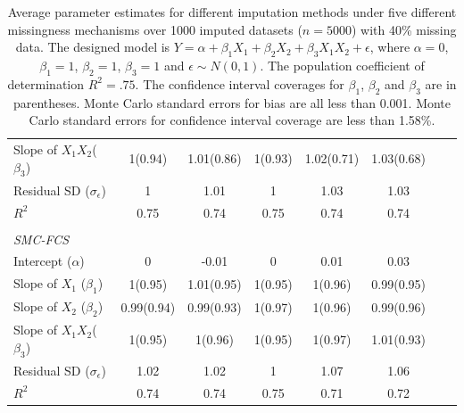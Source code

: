 \begin{table}[ht!]
{\begin{tabular}{lcccccrl}
				Slope of $X_1X_2$($\beta_3$)     &1(0.94) &1.01(0.86)   &1(0.93) &1.02(0.71)  &1.03(0.68)\\
				Residual SD ($\sigma_\epsilon$) 	&1		&1.01		&1		&1.03	&1.03\\	
				$R^2$						&0.75	&0.74	&0.75	&0.74	&0.74\\\\
				\textit{SMC-FCS}	&&&&&\\
				Intercept ($\alpha$)				&0	&-0.01	&0	&0.01	&0.03\\
				Slope of $X_1$ ($\beta_1$)			&1(0.95)	&1.01(0.95)	&1(0.95)	&1(0.96)	&0.99(0.95)\\
				Slope of $X_2$ ($\beta_2$)		&0.99(0.94)	&0.99(0.93)	&1(0.97)	&1(0.96)	&0.99(0.96)\\
				Slope of $X_1X_2$($\beta_3$)    &1(0.95)  &1(0.96)  &1(0.95)   &1(0.97)  &1.01(0.93)\\
				Residual SD ($\sigma_\epsilon$) 	&1.02	&1.02	&1	&1.07	&1.06\\
				$R^2$						&0.74	&0.74	&0.75		&0.71	&0.72\\\hline
			\end{tabular}
		}
		\caption{Average parameter estimates for different imputation methods under five different missingness mechanisms over 1000 imputed datasets ($n=5000$) with 40\% missing data. The designed model is $Y = \alpha+ \beta_1X_1 +  \beta_2X_2 + \beta_3X_1X_2 + \epsilon$, where $\alpha=0$, $\beta_1=1$, $\beta_2=1$, $\beta_3=1$ and $\epsilon \sim N (0,1)$. The population coefficient of determination $R^2=.75$. The confidence interval coverages for $\beta_1$, $\beta_2$ and $\beta_3$ are in parentheses. Monte Carlo standard errors for bias are all less than 0.001. Monte Carlo standard errors for confidence interval coverage are less than 1.58\%.}
		\label{tab3_3}
		
	\end{table}
	

